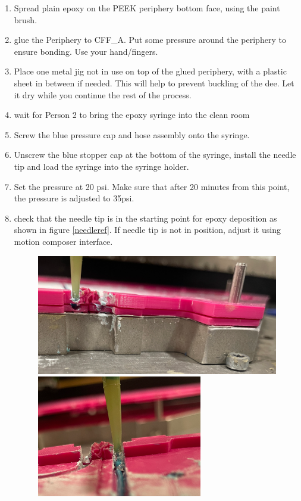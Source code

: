 \documentclass[12pt]{cornelltfpxsop}
\begin{document}
\begin{paracol}{2}
\begin{enumerate}
    \item Spread plain epoxy on the PEEK periphery bottom face, using the paint brush.
    \item glue the Periphery to CFF\_A. Put some pressure around the periphery to ensure bonding. Use your hand/fingers.
    \item Place one metal jig not in use on top of the glued periphery, with a plastic sheet in between if needed. This will help to prevent buckling of the dee. Let it dry while you continue the rest of the process.
    \item wait for Person 2 to bring the epoxy syringe into the clean room

        \item Screw the blue pressure cap and hose assembly onto the syringe.
        \item Unscrew the blue stopper cap at the bottom of the syringe, install the needle tip and load the syringe into the syringe holder.
        \item Set the pressure at 20 psi. Make sure that after 20 minutes from this point, the pressure is adjusted to 35psi.
        \item check that the needle tip is in the starting point for epoxy deposition as shown in figure \ref{needleref}. If needle tip is not in position, adjust it using motion composer interface.
        \begin{figure}[h!]
            \centering
            \includegraphics[width=0.45\linewidth]{img/NeedleRef.png}
            \includegraphics[width=0.45\linewidth]{img/NeedleRef2.png}

\end{figure}
\end{enumerate}
\end{paracol}
\end{document}
